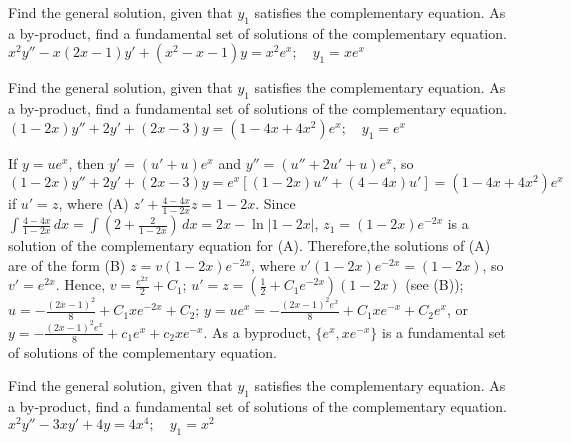 \documentclass{ximera}
\begin{document}
\begin{problem}\label{exer:5.6.11}
Find the general solution,
given that $y_1$ satisfies the complementary equation. As a by-product,
find a fundamental set of solutions of the complementary equation. $x^2y''-x(2x-1)y'+(x^2-x-1)y=x^2e^x;  \quad y_1=xe^x$
\end{problem}

\begin{problem}\label{exer:5.6.12}
Find the general solution,
given that $y_1$ satisfies the complementary equation. As a by-product,
find a fundamental set of solutions of the complementary equation. $(1-2x)y''+2y'+(2x-3)y=(1-4x+4x^2)e^x;  \quad y_1=e^x$

\begin{solution}
    If $y=ue^x$, then $y'=(u'+u)e^x$ and $y''=(u''+2u'+u)e^x$, so
$(1-2x)y''+2y'+(2x-3)y=e^x\left[(1-2x)u''+(4-4x)u'\right]=(1-4x+4x^2)e^x$
if $u'=z$, where (A) $z'+\frac{4-4x}{1-2x}z=1-2x$. Since
$\int\frac{4-4x}{1-2x}\,dx=
\int{\left(2+\frac{2}{1-2x}\right)}\,dx=2x-\ln|1-2x|$,
$z_1=(1-2x)e^{-2x}$ is a solution of the complementary equation for
(A). Therefore,the solutions of (A) are of the form (B)
$z=v(1-2x)e^{-2x}$, where $v'(1-2x)e^{-2x}=(1-2x)$, so $v'=e^{2x}$.
Hence, $v=\frac{e^{2x}}{2}+C_1$;\;
$u'=z=\left(\frac{1}{2}+C_1e^{-2x}\right)(1-2x)$ (see (B));\;
$u=-\frac{(2x-1)^2}{8}+C_1xe^{-2x}+C_2$;\;
$y=ue^x=-\frac{(2x-1)^2e^x}{8}+C_1xe^{-x}+C_2e^x$, or
$y=-\frac{(2x-1)^2e^x}{8}+c_1e^x+c_2xe^{-x}$. As a byproduct,
$\{e^x,xe^{-x}\}$ is a fundamental set of solutions of the
complementary equation.
\end{solution}
\end{problem}

\begin{problem}\label{exer:5.6.13}
Find the general solution,
given that $y_1$ satisfies the complementary equation. As a by-product,
find a fundamental set of solutions of the complementary equation. $x^2y''-3xy'+4y=4x^4;  \quad y_1=x^2$
\end{problem}
\end{document}
